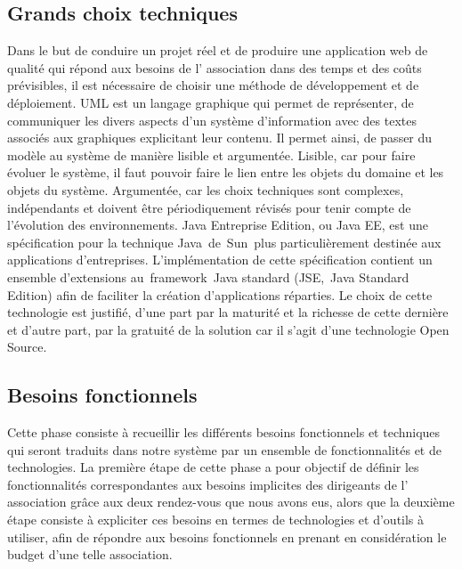 \documentclass[a4paper, titlepage]{report}
\begin{document}
\subsection{Grands choix techniques}

Dans le but de conduire un projet réel et de produire une application
web de qualité qui répond aux besoins de l' association dans des temps
et des coûts prévisibles, il est nécessaire de choisir une méthode de
développement et de déploiement. UML est un langage graphique qui permet
de représenter, de communiquer les divers aspects d'un système
d'information avec des textes associés aux graphiques explicitant leur
contenu. Il permet ainsi, de passer du modèle au système de manière
lisible et argumentée. Lisible, car pour faire évoluer le système, il
faut pouvoir faire le lien entre les objets du domaine et les objets du
système. Argumentée, car les choix techniques sont complexes,
indépendants et doivent être périodiquement révisés pour tenir compte de
l'évolution des environnements. Java Entreprise Edition, ou Java EE, est
une spécification pour la technique Java~de~Sun~plus particulièrement
destinée aux applications d'entreprises. L'implémentation de cette
spécification contient un ensemble d'extensions au~framework~Java
standard (JSE,~Java Standard Edition) afin de faciliter la création
d'applications réparties. Le choix de cette technologie est justifié,
d'une part par la maturité et la richesse de cette dernière et d'autre
part, par la gratuité de la solution car il s'agit d'une technologie
Open Source.

\subsection{Besoins fonctionnels}

Cette phase consiste à recueillir les différents besoins fonctionnels et
techniques qui seront traduits dans notre système par un ensemble de
fonctionnalités et de technologies. La première étape de cette phase a
pour objectif de définir les fonctionnalités correspondantes aux besoins implicites des dirigeants de l'
association grâce aux deux rendez-vous que nous avons eus, alors que la deuxième étape consiste à
expliciter ces besoins en termes de technologies et d'outils à utiliser,
afin de répondre aux besoins fonctionnels en prenant en considération le
budget d'une telle association.
\end{document}
